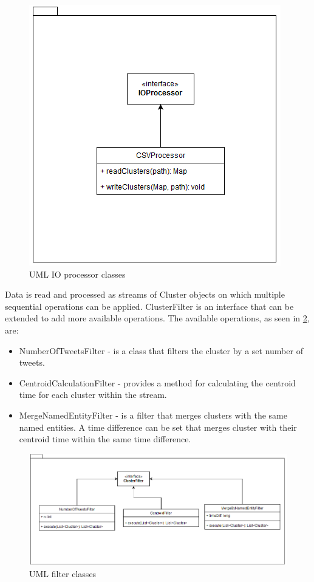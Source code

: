 \documentclass[a4paper,portrait,12pt]{article}
\begin{document}
\begin{figure}[h!]
	\centering
	\includegraphics[width=0.5\linewidth]{images/processorUML.png}
	\caption{UML IO processor classes}
	\label{fig:processorUML}
\end{figure}

Data is read and processed as streams of Cluster objects on which multiple sequential operations can be applied.
ClusterFilter is an interface that can be extended to add more available operations. The available operations, as seen in \ref{fig:filterUML}, are:
\begin{itemize}
	\item NumberOfTweetsFilter - is a class that filters the cluster by a set number of tweets.
	\item CentroidCalculationFilter - provides a method for calculating the centroid time for each cluster within the stream.
	\item MergeNamedEntityFilter - is a filter that merges clusters with the same named entities. A time difference can be set that merges cluster with their centroid time within the same time difference.
\end{itemize}

\begin{figure}[h!]
	\centering
	\includegraphics[width=0.7\linewidth]{images/filterUML.png}
	\caption{UML filter classes}
	\label{fig:filterUML}
\end{figure}
\end{document}
